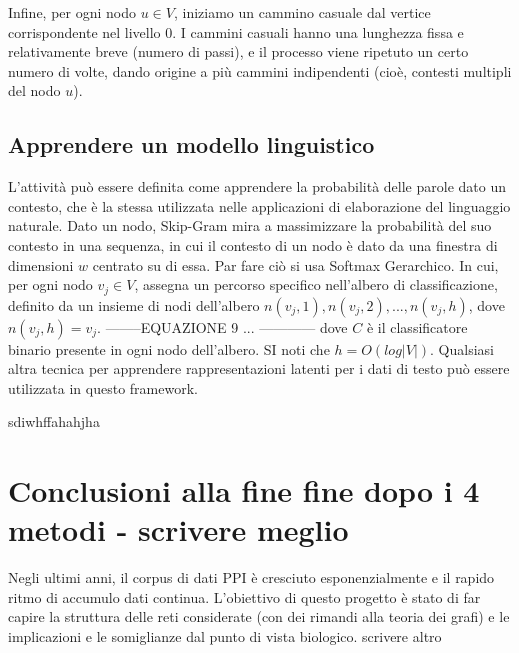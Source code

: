 \documentclass[11pt]{article}
\begin{document}
Infine, per ogni nodo $u\in V$, iniziamo un cammino casuale dal vertice corrispondente nel livello $0$. I cammini casuali hanno una lunghezza fissa e relativamente breve (numero di passi), e il processo viene ripetuto un certo numero di volte, dando origine a più cammini indipendenti (cioè, contesti multipli del nodo $u$).

\subsection{Apprendere un modello linguistico}
L'attività può essere definita come apprendere la probabilità delle parole dato un contesto, che è la stessa utilizzata nelle applicazioni di elaborazione del linguaggio naturale.
Dato un nodo, Skip-Gram mira a massimizzare la probabilità del suo contesto in una sequenza, in cui il contesto di un nodo è dato da una finestra di dimensioni $w$ centrato su di essa. Par fare ciò si usa Softmax Gerarchico. In cui, per ogni nodo $v_j\in V$, assegna un percorso specifico nell'albero di classificazione, definito da un insieme di nodi dell'albero $n(v_j,1),n(v_j,2),...,n(v_j,h)$, dove $n(v_j,h)=v_j$.
--------EQUAZIONE 9 $...$ ------------
dove $C$ è il classificatore binario presente in ogni nodo dell'albero. SI noti che $h=O(log{|V|})$.
Qualsiasi altra tecnica per apprendere rappresentazioni latenti per i dati di testo può essere utilizzata in questo framework.




sdiwhffahahjha


\pagebreak
\section{Conclusioni alla fine fine dopo i 4 metodi - scrivere meglio}
Negli ultimi anni, il corpus di dati PPI è cresciuto esponenzialmente e il rapido ritmo di accumulo dati continua. L'obiettivo di questo progetto è stato di far capire la struttura delle reti considerate (con dei rimandi alla teoria dei grafi) e le implicazioni  e le somiglianze dal punto di vista biologico. scrivere altro

\pagebreak 
\end{document}
